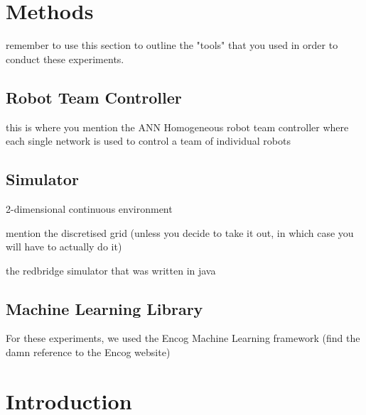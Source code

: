 \documentclass[conference]{IEEEtran}
\begin{document}
\section{Methods}

remember to use this section to outline the "tools" that you used in order to conduct these experiments.

\subsection{Robot Team Controller}
this is where you mention the ANN 
Homogeneous robot team controller where each single network is used to control a team of individual robots

\subsection{Simulator}

2-dimensional continuous environment

mention the discretised grid (unless you decide to take it out, in which case you will have to actually do it)

the redbridge simulator that was written in java

\subsection{Machine Learning Library}

For these experiments, we used the Encog Machine Learning framework (find the damn reference to the Encog website)        


\section{Introduction}
\end{document}

